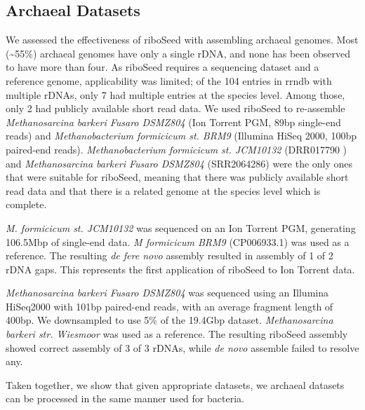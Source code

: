 \documentclass[10pt]{article}
\def \ttilde {\raisebox{-.5ex}\textasciitilde} %
\begin{document}
\subsection*{Archaeal Datasets}
We assessed the effectiveness of riboSeed with assembling archaeal genomes. Most (\ttilde55\%) archaeal genomes have only a single rDNA, and none has been observed to have more than four. As riboSeed requires a sequencing dataset and a reference genome, applicability was limited; of the 104 entries in rrndb with multiple rDNAs, only 7 had multiple entries at the species level. Among those, only 2 had publicly available short read data. We used riboSeed to re-assemble \textit{Methanosarcina barkeri Fusaro DSMZ804} (Ion Torrent PGM, 89bp single-end reads) and \textit{Methanobacterium formicicum st. BRM9} (Illumina HiSeq 2000, 100bp paired-end reads). \textit{Methanobacterium formicicum st. JCM10132} (DRR017790 ) and \textit{Methanosarcina barkeri Fusaro DSMZ804} (SRR2064286) were the only ones that were suitable for riboSeed, meaning that there was publicly available short read data and that there is a related genome at the species level which is complete.


\textit{M. formicicum st. JCM10132} was sequenced on an Ion Torrent PGM, generating 106.5Mbp of single-end data. \textit{M formicicum BRM9} (CP006933.1) was used as a reference. The resulting \textit{de fere novo} assembly resulted in assembly of 1 of 2 rDNA gaps. This represents the first application of riboSeed to Ion Torrent data.


\textit{Methanosarcina barkeri Fusaro DSMZ804} was sequenced using an Illumina HiSeq2000 with 101bp paired-end reads, with an average fragment length of 400bp. We downsampled to use 5\% of the 19.4Gbp dataset. \textit{Methanosarcina barkeri str. Wiesmoor} was used as a reference. The resulting riboSeed assembly showed correct assembly of 3 of 3 rDNAs, while \textit{de novo} assemble failed to resolve any.


Taken together, we show that given appropriate datasets, we archaeal datasets can be processed in the same manner used for bacteria.
\end{document}
